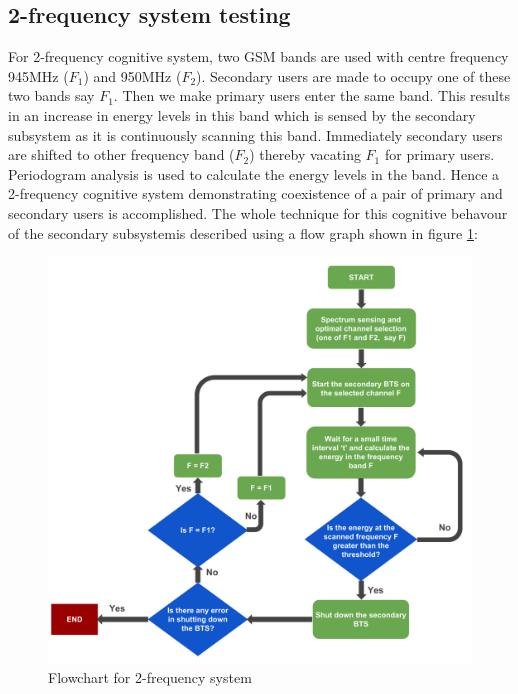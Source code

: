 \subsection{2-frequency system testing}
For 2-frequency cognitive system, two GSM bands are used with centre 
frequency 945MHz ($F_1$) and 950MHz ($F_2$). Secondary users are made to occupy 
one of these two bands say $F_1$. Then we make primary users enter the same 
band. This results in an increase in energy levels in this band which is sensed 
by the secondary subsystem as it is continuously scanning this band. 
Immediately secondary users are shifted to other frequency band ($F_2$) thereby 
vacating $F_1$ for primary users. Periodogram analysis is used to calculate the energy levels in the band.
 Hence a 2-frequency cognitive system 
demonstrating coexistence of a pair of primary and secondary users is 
accomplished. 
The whole technique for this cognitive behavour of the secondary subsystemis described using a flow graph shown in figure
\ref{freqSys2}:

\begin{figure}[!h]
\centering
\includegraphics[width=1\textwidth]{../images/freqSys2}
\caption[2-frequency system]{Flowchart for 2-frequency system}
\label{freqSys2}
\end{figure}

